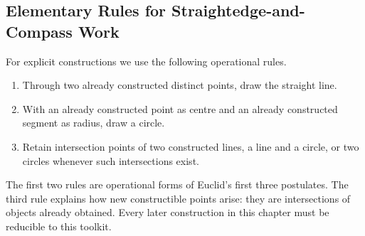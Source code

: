 \subsection{Elementary Rules for Straightedge-and-Compass Work}

For explicit constructions we use the following operational rules.

\begin{corebox}
\begin{enumerate}
    \item Through two already constructed distinct points, draw the straight line.
    \item With an already constructed point as centre and an already constructed
          segment as radius, draw a circle.
    \item Retain intersection points of two constructed lines, a line and a
          circle, or two circles whenever such intersections exist.
\end{enumerate}
\end{corebox}

\begin{interpretationbox}
The first two rules are operational forms of Euclid's first three postulates.
The third rule explains how new constructible points arise: they are intersections
of objects already obtained. Every later construction in this chapter must be
reducible to this toolkit.
\end{interpretationbox}
